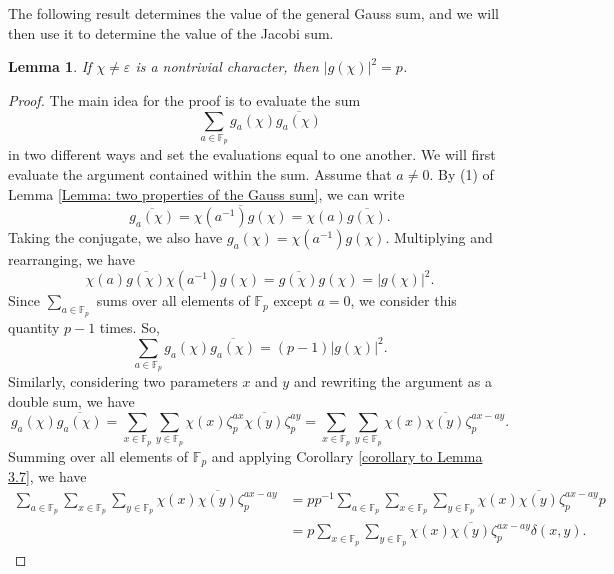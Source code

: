 \documentclass[10pt]{amsart}
\theoremstyle{plain}
\newtheorem{lemma}[thm]{Lemma}
\theoremstyle{definition}
\theoremstyle{remark}
\numberwithin{equation}{section}
\begin{document}
The following result determines the value of the general Gauss sum, and we will then use it to determine the value of the Jacobi sum.

\begin{lemma}\label{Lemma: value of the general Gauss sum}
    If $\chi\neq \varepsilon$ is a nontrivial character, then $|g(\chi)|^{2}=p$. 
\end{lemma}
\begin{proof}
    The main idea for the proof is to evaluate the sum 
    \begin{equation*}
        \sum_{a\in\mathbb{F}_{p}}g_{a}(\chi)\overline{g_{a}(\chi)}
    \end{equation*}
    in two different ways and set the evaluations equal to one another. We will first evaluate the argument contained within the sum. Assume that $a\neq 0$. By (1) of Lemma \ref{Lemma: two properties of the Gauss sum}, we can write 
    \begin{equation*}
        \overline{g_{a}(\chi)} = \overline{\chi(a^{-1})g(\chi)} = \chi(a)\overline{g(\chi)}.
    \end{equation*}
    Taking the conjugate, we also have $g_{a}(\chi) = \chi(a^{-1})g(\chi)$. Multiplying and rearranging, we have
    \begin{equation*}
    \chi(a)\overline{g(\chi)}\chi(a^{-1})g(\chi) = \overline{g(\chi)}g(\chi) = |g(\chi)|^{2}.
    \end{equation*}
    Since $\sum_{a\in\mathbb{F}_{p}}$ sums over all elements of $\mathbb{F}_{p}$ except $a=0$, we consider this quantity $p-1$ times. So,
    \begin{equation*}
        \sum_{a\in\mathbb{F}_{p}}g_{a}(\chi)\overline{g_{a}(\chi)} = (p-1)|g(\chi)|^{2}.
    \end{equation*}
    Similarly, considering two parameters $x$ and $y$ and rewriting the argument as a double sum, we have
    \begin{equation*}
        g_{a}(\chi)\overline{g_{a}(\chi)} = \sum_{x\in\mathbb{F}_{p}}\sum_{y\in\mathbb{F}_{p}}\chi(x)\zeta_{p}^{ax}\overline{\chi(y)}\zeta_{p}^{ay} = \sum_{x\in\mathbb{F}_{p}}\sum_{y\in\mathbb{F}_{p}}\chi(x)\overline{\chi(y)}\zeta_{p}^{ax-ay}.
    \end{equation*}
    Summing over all elements of $\mathbb{F}_{p}$ and applying Corollary \ref{corollary to Lemma 3.7}, we have
    \begin{align*}  \sum_{a\in\mathbb{F}_{p}}\sum_{x\in\mathbb{F}_{p}}\sum_{y\in\mathbb{F}_{p}}\chi(x)\overline{\chi(y)}\zeta_{p}^{ax-ay} & = pp^{-1}\sum_{a\in\mathbb{F}_{p}}\sum_{x\in\mathbb{F}_{p}}\sum_{y\in\mathbb{F}_{p}}\chi(x)\overline{\chi(y)}\zeta_{p}^{ax-ay}p \\ & = p\sum_{x\in\mathbb{F}_{p}}\sum_{y\in\mathbb{F}_{p}}\chi(x)\overline{\chi(y)}\zeta_{p}^{ax-ay}\delta(x,y).

\end{align*}
\end{proof}
\end{document}

